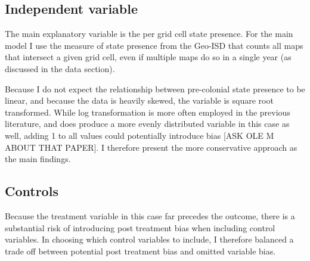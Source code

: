 \documentclass[12pt]{article}
\begin{document}

\subsection{Independent variable}

The main explanatory variable is the per grid cell state presence. For the main
model I use the measure of state presence from the Geo-ISD that counts all maps that
intersect a given grid cell, even if multiple maps do so in a single year (as
discussed in the data section).


Because I do not expect the relationship between pre-colonial state presence to
be linear, and because the data is heavily skewed, the variable is square root
transformed. While log transformation is more often employed in the previous
literature, and does produce a more evenly distributed variable in this case as
well, adding 1 to all values could potentially introduce bias [ASK OLE M ABOUT
THAT PAPER]. I therefore present the more conservative approach as the main
findings.

\subsection{Controls}

Because the treatment variable in this case far precedes the outcome, there is a
substantial risk of introducing post treatment bias when including control
variables. In choosing which control variables to include, I therefore 
balanced a trade off between potential post treatment bias and omitted variable
bias. 
\end{document}
